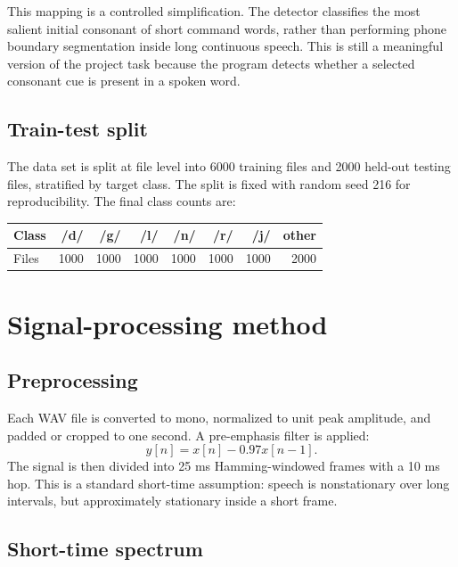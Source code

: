\documentclass[11pt]{article}
\begin{document}
This mapping is a controlled simplification.  The detector classifies the most salient initial consonant of short command words, rather than performing phone boundary segmentation inside long continuous speech.  This is still a meaningful version of the project task because the program detects whether a selected consonant cue is present in a spoken word.

\subsection{Train-test split}

The data set is split at file level into 6000 training files and 2000 held-out testing files, stratified by target class.  The split is fixed with random seed 216 for reproducibility.  The final class counts are:

\begin{center}
\begin{tabular}{@{}lrrrrrrr@{}}
\toprule
Class & /d/ & /g/ & /l/ & /n/ & /r/ & /j/ & other \\
\midrule
Files & 1000 & 1000 & 1000 & 1000 & 1000 & 1000 & 2000 \\
\bottomrule
\end{tabular}
\end{center}

\section{Signal-processing method}

\subsection{Preprocessing}

Each WAV file is converted to mono, normalized to unit peak amplitude, and padded or cropped to one second.  A pre-emphasis filter is applied:
\begin{equation}
    y[n] = x[n] - 0.97x[n-1].
\end{equation}
The signal is then divided into 25 ms Hamming-windowed frames with a 10 ms hop.  This is a standard short-time assumption: speech is nonstationary over long intervals, but approximately stationary inside a short frame.

\subsection{Short-time spectrum}
\end{document}
